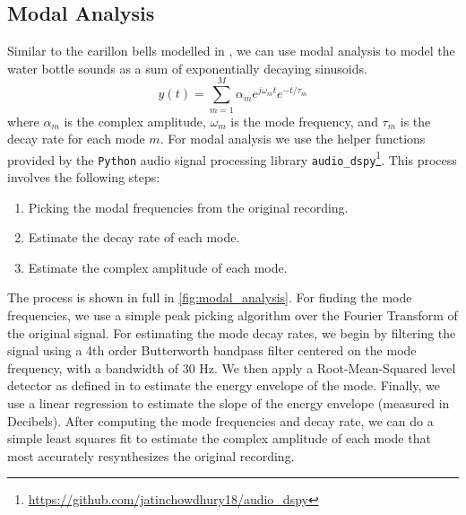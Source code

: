 \documentclass[twoside,a4paper]{article}
\begin{document}
\subsection{Modal Analysis} \label{sec:modal-analysis}
%
Similar to the carillon bells modelled in \cite{canfielddafilou:werner:bellEffects:2017,rau:das:canfielddafilou:carillon:2019},
we can use modal analysis to model the water bottle sounds as
a sum of exponentially decaying sinusoids.
\begin{equation}
    y(t) = \sum_{m=1}^M \alpha_m e^{j\omega_m t} e^{-t/\tau_m}
    \label{eq:modal-def}
\end{equation}
%
where $\alpha_m$ is the complex amplitude, $\omega_m$ is the mode
frequency, and $\tau_m$ is the decay rate for each mode $m$.
\newline\newline
For modal analysis we use the helper functions
provided by the \texttt{Python} audio signal processing library
\texttt{audio\_dspy}\footnote{\url{https://github.com/jatinchowdhury18/audio_dspy}}.
This process involves the following steps:
\begin{enumerate}
    \item Picking the modal frequencies from the original recording.
    \item Estimate the decay rate of each mode.
    \item Estimate the complex amplitude of each mode.
\end{enumerate}
%
The process is shown in  full in \cref{fig:modal_analysis}.
\newline\newline
For finding the mode frequencies, we use a simple peak picking
algorithm over the Fourier Transform of the original signal.
\newline\newline
For estimating the mode decay rates, we begin by filtering
the signal using a 4th order Butterworth bandpass filter
centered on the mode frequency, with a bandwidth of 30 Hz.
We then apply a Root-Mean-Squared level detector as defined
in \cite{giannoulis2012compressor} to estimate the energy
envelope of the mode. Finally, we use a linear regression
to estimate the slope of the energy envelope (measured in
Decibels).
\newline\newline
After computing the mode frequencies and decay
rate, we can do a simple least squares fit to
estimate the complex amplitude of each mode that
most accurately resynthesizes the original recording.
\end{document}
